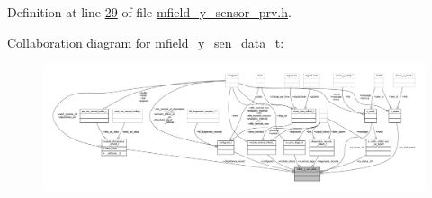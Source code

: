 Definition at line \hyperlink{a00026_source_l00029}{29} of file \hyperlink{a00026_source}{mfield\+\_\+y\+\_\+sensor\+\_\+prv.\+h}.



Collaboration diagram for mfield\+\_\+y\+\_\+sen\+\_\+data\+\_\+t\+:\nopagebreak
\begin{figure}[H]
\begin{center}
\leavevmode
\includegraphics[width=350pt]{d7/dd4/a00968}
\end{center}
\end{figure}
